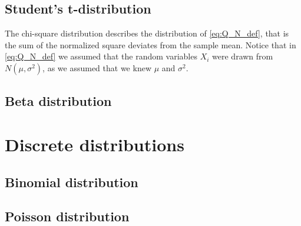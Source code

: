 \subsection{Student's t-distribution}

The chi-square distribution describes the distribution of \eqref{eq:Q_N_def},
that is the sum of the normalized square deviates from the sample mean.
Notice that in \eqref{eq:Q_N_def} we assumed that the random
variables $X_i$ were drawn from $N\left(\mu,\sigma^2\right)$, as we
assumed that we knew $\mu$ and $\sigma^2$. 
 

\subsection{Beta distribution}
\section{Discrete distributions}
\subsection{Binomial distribution}
\subsection{Poisson distribution}
